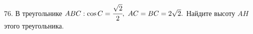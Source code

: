 76. В треугольнике $ABC: \cos C=\cfrac{\sqrt{2}}{2},\ AC=BC=2\sqrt{2}.$ Найдите высоту $AH$ этого треугольника.\\
